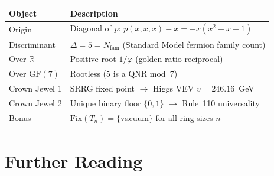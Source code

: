 \documentclass[11pt,a4paper]{article}
\newcommand{\Nfam}{N_{\mathrm{fam}}}
\begin{document}
\bigskip
\begin{tcolorbox}[colback=gray!5,colframe=gray!50!black,
  title=The master quadratic at a glance]
\begin{center}
\renewcommand{\arraystretch}{1.5}
\begin{tabular}{@{}ll@{}}
\toprule
\textbf{Object} & \textbf{Description} \\
\midrule
Origin          & Diagonal of $p$: $p(x,x,x)-x = -x(x^2+x-1)$ \\
Discriminant    & $\Delta = 5 = \Nfam$ (Standard Model fermion family count) \\
Over $\mathbb{R}$   & Positive root $1/\varphi$ (golden ratio reciprocal) \\
Over $\mathrm{GF}(7)$ & Rootless ($5$ is a QNR mod~7) \\
Crown Jewel 1   & SRRG fixed point $\to$ Higgs VEV $v = 246.16$~GeV \\
Crown Jewel 2   & Unique binary floor $\{0,1\}$ $\to$ Rule~110 universality \\
Bonus           & $\mathrm{Fix}(T_n) = \{\text{vacuum}\}$ for all ring sizes $n$ \\
\bottomrule
\end{tabular}
\end{center}
\end{tcolorbox}

\section*{Further Reading}
\end{document}
